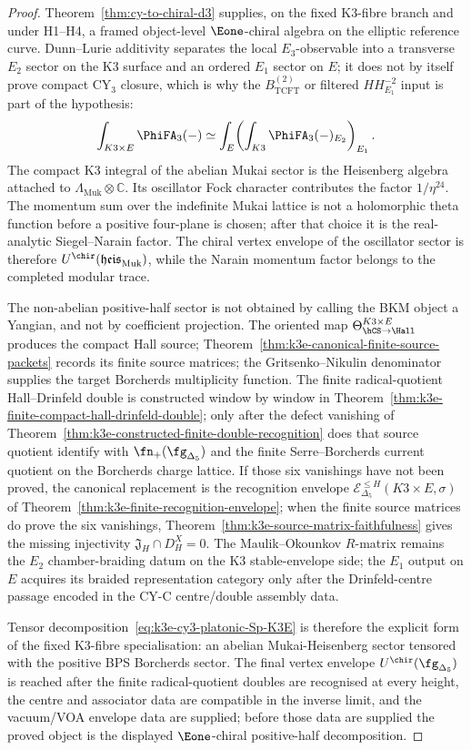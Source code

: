 \begin{proof}
Theorem~\ref{thm:cy-to-chiral-d3} supplies, on the fixed K3-fibre branch and under H1--H4, a framed object-level $\Eone$-chiral algebra on the elliptic reference curve. Dunn--Lurie additivity separates the local $E_3$-observable into a transverse $E_2$ sector on the K3 surface and an ordered $E_1$ sector on $E$; it does not by itself prove compact CY$_3$ closure, which is why the $B_{\mathrm{TCFT}}^{(2)}$ or filtered $HH^{-2}_{E_1}$ input is part of the hypothesis:
\[
 \int_{K3\times E}\PhiFA_3(-)
 \simeq
 \int_E\!\left(\int_{K3}\PhiFA_3(-)_{E_2}\right)_{E_1}.
\]
The compact K3 integral of the abelian Mukai sector is the Heisenberg
algebra attached to
\(\Lambda_{\mathrm{Muk}}\otimes\mathbb C\). Its oscillator Fock
character contributes the factor \(1/\eta^{24}\). The momentum sum over
the indefinite Mukai lattice is not a holomorphic theta function before
a positive four-plane is chosen; after that choice it is the
real-analytic Siegel--Narain factor. The chiral vertex envelope of the
oscillator sector is therefore
\(U^{\chir}(\mathfrak{heis}_{\mathrm{Muk}})\), while the Narain
momentum factor belongs to the completed modular trace.

The non-abelian positive-half sector is not obtained by calling the BKM object a Yangian, and not by coefficient projection. The oriented map $\ThetaHCSHall$ produces the compact Hall source; Theorem~\ref{thm:k3e-canonical-finite-source-packets} records its finite source matrices; the Gritsenko--Nikulin denominator supplies the target Borcherds multiplicity function. The finite radical-quotient Hall--Drinfeld double is constructed window by window in Theorem~\ref{thm:k3e-finite-compact-hall-drinfeld-double}; only after the defect vanishing of Theorem~\ref{thm:k3e-constructed-finite-double-recognition} does that source quotient identify with $\fn_+(\fg_{\Delta_5})$ and the finite Serre--Borcherds current quotient on the Borcherds charge lattice. If those six vanishings have not been proved, the canonical replacement is the recognition envelope \(\mathcal E^{\le H}_{\Delta_5}(K3\times E,\sigma)\) of Theorem~\ref{thm:k3e-finite-recognition-envelope}; when the finite source matrices do prove the six vanishings, Theorem~\ref{thm:k3e-source-matrix-faithfulness} gives the missing injectivity \(\mathfrak J_H\cap D_H^X=0\). The Maulik--Okounkov $R$-matrix remains the $E_2$ chamber-braiding datum on the K3 stable-envelope side; the $E_1$ output on $E$ acquires its braided representation category only after the Drinfeld-centre passage encoded in the CY-C centre/double assembly data.

Tensor decomposition~\eqref{eq:k3e-cy3-platonic-Sp-K3E} is therefore the explicit form of the fixed K3-fibre specialisation: an abelian Mukai-Heisenberg sector tensored with the positive BPS Borcherds sector. The final vertex envelope $U^{\chir}(\fg_{\Delta_5})$ is reached after the finite radical-quotient doubles are recognised at every height, the centre and associator data are compatible in the inverse limit, and the vacuum/VOA envelope data are supplied; before those data are supplied the proved object is the displayed $\Eone$-chiral positive-half decomposition.
\end{proof}

